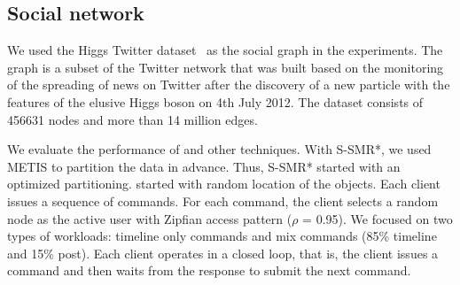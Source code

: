 \subsection{Social network}

We used the Higgs Twitter dataset~\cite{snapnets} as the social graph in the
experiments. The graph is a subset of the Twitter network that was built based
on the monitoring of the spreading of news on Twitter after the discovery of a
new particle with the features of the elusive Higgs boson on 4th July 2012. The
dataset consists of 456631 nodes and more than 14 million edges.

We evaluate the performance of \dynastar and other techniques. With S-SMR*, we
used METIS to partition the data in advance. Thus, S-SMR* started with an
optimized partitioning. \dynastar started with random location of the objects.
Each client issues a sequence of commands. For each command, the client selects
a random node as the active user with Zipfian access pattern ($\rho$ = 0.95). We
focused on two types of workloads: timeline only commands and mix commands (85\%
timeline and 15\% post). Each client operates in a closed loop, that is, the
client issues a command and then waits from the response to submit the next
command.

